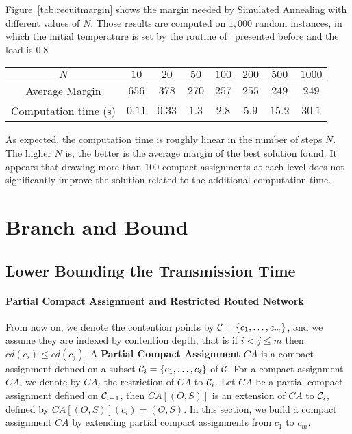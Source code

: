   
Figure~\ref{tab:recuitmargin} shows the margin needed by Simulated Annealing with different values of $N$. Those results are computed on $1,000$ random instances, in which the initial temperature is set by the routine of~\cite{osman1997meta} presented before and the load is $0.8$


\begin{center}
\begin{tabular}{ |c|c|c|c|c|c|c|c| }
\hline
    $N$ & $10$& $20$& $50$ &$100$&$200$& $500$& $1000$\\
    \hline
    Average Margin & $656$& $378$& $270$ &$257$ & $255$& $249$& $249$ \\
    \hline
    Computation time (s)& $0.11$& $0.33$& $1.3$ &$2.8$ & $5.9$& $15.2$& $30.1$\\
    \hline
 \end{tabular}
\end{center}

As expected, the computation time is roughly linear in the number of steps $N$. The higher $N$ is, the better is the average margin of the best solution found. It appears that drawing more than $100$ compact assignments at each level does not significantly improve the solution related to the additional computation time. 

 

\section{Branch and Bound}

\subsection{Lower Bounding the Transmission Time}

\paragraph{Partial Compact Assignment and Restricted Routed Network}

From now on, we denote the contention points by ${\cal C} = \{c_1,\dots, c_m\}$,
and we assume they are indexed by contention depth, that is  if $i < j \leq m$ then  $cd(c_i) \leq cd(c_j)$. 
A \textbf{Partial Compact Assignment} $CA$ is a compact assignment defined on a subset ${\cal C}_i = \{c_1,\ldots,c_i\}$ of ${\cal C}$. For a compact assignment $CA$, we denote by $CA_i$ the restriction of $CA$ to ${\cal C}_i$.
Let $CA$ be a partial compact assignment defined on ${\cal C}_{i-1}$, then $CA[(O,S)]$ is an extension of $CA$ to ${\cal C}_{i}$, defined by $CA[(O,S)](c_i) = (O,S)$.
 In this section, we build a compact assignment $CA$ by extending partial compact assignments from $c_1$ to $c_m$.

